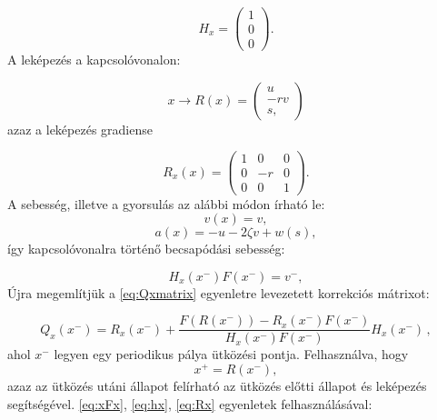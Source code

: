 \begin{equation}\label{eq:hx}
H_x=\begin{pmatrix}
1\\
0\\
0
\end{pmatrix}.
\end{equation}
A leképezés a kapcsolóvonalon:

\begin{equation}
x \rightarrow R(x)=\begin{pmatrix}
u\\
-r v\\
s,
\end{pmatrix}
\end{equation}
azaz a leképezés gradiense

\begin{equation}\label{eq:Rx}
R_x(x)=\begin{pmatrix}
1 & 0 & 0\\
0 & -r & 0\\
0 & 0 & 1
\end{pmatrix}.
\end{equation}
A sebesség, illetve a gyorsulás az alábbi módon írható le:
\begin{equation}
v(x)=v,
\end{equation}
\begin{equation}
a(x)=-u-2\zeta v+w(s),
\end{equation}
%
így kapcsolóvonalra történő becsapódási sebesség:

\begin{equation}
H_x(x^-) F(x^-) = v^-,
\end{equation}
Újra megemlítjük a \eqref{eq:Qxmatrix} egyenletre levezetett korrekciós mátrixot:

\begin{equation}\label{eq:Qxmatrix2}
Q_x(x^-)=R_x(x^-)+\frac{F(R(x^-))-R_x(x^-)F(x^-)}{H_x(x^-)F(x^-)}H_x(x^-)\,,
\end{equation}
ahol $x^-$ legyen egy periodikus pálya ütközési pontja. Felhasználva, hogy 
\begin{equation}
x^+=R(x^-),
\end{equation}
azaz az ütközés utáni állapot felírható az ütközés előtti állapot és leképezés segítségével. \eqref{eq:xFx}, \eqref{eq:hx}, \eqref{eq:Rx} egyenletek felhasználásával:

